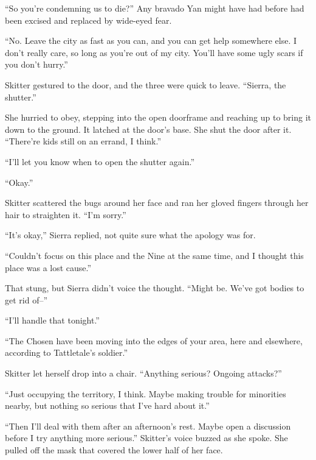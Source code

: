 ``So you're condemning us to die?''  Any bravado Yan might have had before had been excised and replaced by wide-eyed fear.



``No.  Leave the city as fast as you can, and you can get help somewhere else.  I don't really care, so long as you're out of my city.  You'll have some ugly scars if you don't hurry.''



Skitter gestured to the door, and the three were quick to leave.  ``Sierra, the shutter.''



She hurried to obey, stepping into the open doorframe and reaching up to bring it down to the ground.  It latched at the door's base.  She shut the door after it.  ``There're kids still on an errand, I think.''



``I'll let you know when to open the shutter again.''



``Okay.''



Skitter scattered the bugs around her face and ran her gloved fingers through her hair to straighten it.  ``I'm sorry.''



``It's okay,'' Sierra replied, not quite sure what the apology was for.



``Couldn't focus on this place and the Nine at the same time, and I thought this place was a lost cause.''



That stung, but Sierra didn't voice the thought.  ``Might be.  We've got bodies to get rid of--''



``I'll handle that tonight.''



``The Chosen have been moving into the edges of your area, here and elsewhere, according to Tattletale's soldier.''



Skitter let herself drop into a chair.  ``Anything serious?  Ongoing attacks?''



``Just occupying the territory, I think.  Maybe making trouble for minorities nearby, but nothing so serious that I've hard about it.''



``Then I'll deal with them after an afternoon's rest.  Maybe open a discussion before I try anything more serious.''  Skitter's voice buzzed as she spoke.  She pulled off the mask that covered the lower half of her face.



